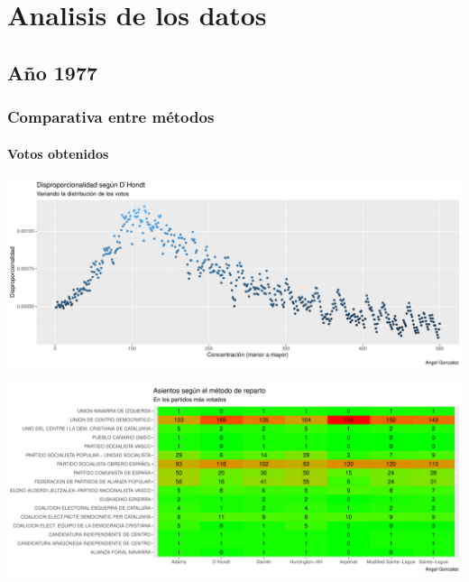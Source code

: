 \documentclass[12pt,a4paper,]{book}
\title{}
\author{Nombre Completo Autor}
\date{27/10/2017}
\def\ifdoblecara{} %
\def\ifprincipal{} %
\let\ifprincipal\undefined %
\numberwithin{dummy}{section}
\theoremstyle{ocrenumbox}
\theoremstyle{blacknumex}
\theoremstyle{blacknumbox}
\theoremstyle{ocrenum}
\theoremstyle{ocrenum}
\begin{document}
\ifdefined\ifprincipal
\else
\setlength{\parindent}{1em}
\pagestyle{fancy}
\setcounter{tocdepth}{4}
\tableofcontents

\fi

\ifdefined\ifdoblecara
\fancyhead{}{}
\fancyhead[LE,RO]{\scriptsize\rightmark}
\fancyfoot[LO,RE]{\scriptsize\slshape \leftmark}
\fancyfoot[C]{}
\fancyfoot[LE,RO]{\footnotesize\thepage}
\else
\fancyhead{}{}
\fancyhead[RO]{\scriptsize\rightmark}
\fancyfoot[LO]{\scriptsize\slshape \leftmark}
\fancyfoot[C]{}
\fancyfoot[RO]{\footnotesize\thepage}
\fi
\renewcommand{\headrulewidth}{0.4pt}
\renewcommand{\footrulewidth}{0.4pt}

\hypertarget{analisis-de-los-datos}{%
\chapter{Analisis de los datos}\label{analisis-de-los-datos}}

\hypertarget{auxf1o-1977}{%
\section{Año 1977}\label{auxf1o-1977}}

\hypertarget{comparativa-entre-muxe9todos}{%
\subsection{Comparativa entre
métodos}\label{comparativa-entre-muxe9todos}}

\hypertarget{votos-obtenidos}{%
\subsubsection{Votos obtenidos}\label{votos-obtenidos}}

\begin{center}\includegraphics[width=0.95\linewidth]{figurasR/unnamed-chunk-11-1} \end{center}

\begin{center}\includegraphics[width=0.95\linewidth]{figurasR/unnamed-chunk-11-2} \end{center}
\end{document}
